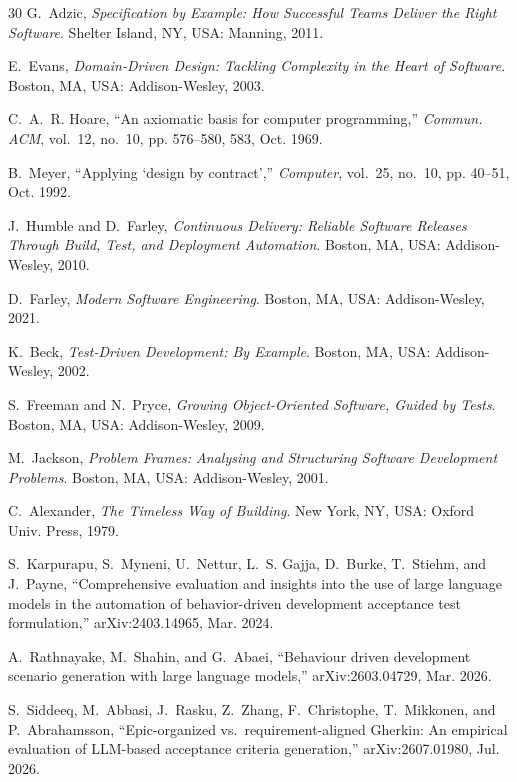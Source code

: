 \documentclass[conference]{IEEEtran}
\begin{document}
\begin{thebibliography}{30}
G.~Adzic, \emph{Specification by Example: How Successful Teams Deliver the Right Software}. Shelter Island, NY, USA: Manning, 2011.

E.~Evans, \emph{Domain-Driven Design: Tackling Complexity in the Heart of Software}. Boston, MA, USA: Addison-Wesley, 2003.

C.~A.~R. Hoare, ``An axiomatic basis for computer programming,'' \emph{Commun. ACM}, vol.~12, no.~10, pp. 576--580, 583, Oct. 1969.

B.~Meyer, ``Applying `design by contract','' \emph{Computer}, vol.~25, no.~10, pp. 40--51, Oct. 1992.

J.~Humble and D.~Farley, \emph{Continuous Delivery: Reliable Software Releases Through Build, Test, and Deployment Automation}. Boston, MA, USA: Addison-Wesley, 2010.

D.~Farley, \emph{Modern Software Engineering}. Boston, MA, USA: Addison-Wesley, 2021.

K.~Beck, \emph{Test-Driven Development: By Example}. Boston, MA, USA: Addison-Wesley, 2002.

S.~Freeman and N.~Pryce, \emph{Growing Object-Oriented Software, Guided by Tests}. Boston, MA, USA: Addison-Wesley, 2009.

M.~Jackson, \emph{Problem Frames: Analysing and Structuring Software Development Problems}. Boston, MA, USA: Addison-Wesley, 2001.

C.~Alexander, \emph{The Timeless Way of Building}. New York, NY, USA: Oxford Univ. Press, 1979.

S.~Karpurapu, S.~Myneni, U.~Nettur, L.~S. Gajja, D.~Burke, T.~Stiehm, and J.~Payne, ``Comprehensive evaluation and insights into the use of large language models in the automation of behavior-driven development acceptance test formulation,'' arXiv:2403.14965, Mar. 2024.

A.~Rathnayake, M.~Shahin, and G.~Abaei, ``Behaviour driven development scenario generation with large language models,'' arXiv:2603.04729, Mar. 2026.

S.~Siddeeq, M.~Abbasi, J.~Rasku, Z.~Zhang, F.~Christophe, T.~Mikkonen, and P.~Abrahamsson, ``Epic-organized vs.\ requirement-aligned Gherkin: An empirical evaluation of LLM-based acceptance criteria generation,'' arXiv:2607.01980, Jul. 2026.


\end{thebibliography}
\end{document}
